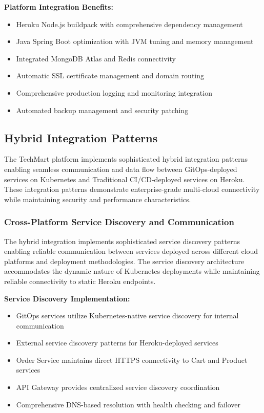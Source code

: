 \textbf{Platform Integration Benefits:}
\begin{itemize}
\item Heroku Node.js buildpack with comprehensive dependency management
\item Java Spring Boot optimization with JVM tuning and memory management
\item Integrated MongoDB Atlas and Redis connectivity
\item Automatic SSL certificate management and domain routing
\item Comprehensive production logging and monitoring integration
\item Automated backup management and security patching
\end{itemize}

\subsection{Hybrid Integration Patterns}

The TechMart platform implements sophisticated hybrid integration patterns enabling seamless communication and data flow between GitOps-deployed services on Kubernetes and Traditional CI/CD-deployed services on Heroku. These integration patterns demonstrate enterprise-grade multi-cloud connectivity while maintaining security and performance characteristics.

\subsubsection{Cross-Platform Service Discovery and Communication}

The hybrid integration implements sophisticated service discovery patterns enabling reliable communication between services deployed across different cloud platforms and deployment methodologies. The service discovery architecture accommodates the dynamic nature of Kubernetes deployments while maintaining reliable connectivity to static Heroku endpoints.

\textbf{Service Discovery Implementation:}
\begin{itemize}
\item GitOps services utilize Kubernetes-native service discovery for internal communication
\item External service discovery patterns for Heroku-deployed services
\item Order Service maintains direct HTTPS connectivity to Cart and Product services
\item API Gateway provides centralized service discovery coordination
\item Comprehensive DNS-based resolution with health checking and failover
\end{itemize}

